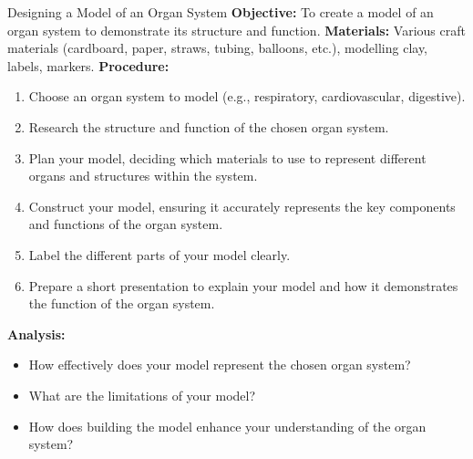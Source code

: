 \begin{investigation}{Designing a Model of an Organ System}
\textbf{Objective:} To create a model of an organ system to demonstrate its structure and function.
\textbf{Materials:}  Various craft materials (cardboard, paper, straws, tubing, balloons, etc.), modelling clay, labels, markers.
\textbf{Procedure:}
\begin{enumerate}
    \item Choose an organ system to model (e.g., respiratory, cardiovascular, digestive).
    \item Research the structure and function of the chosen organ system.
    \item Plan your model, deciding which materials to use to represent different organs and structures within the system.
    \item Construct your model, ensuring it accurately represents the key components and functions of the organ system.
    \item Label the different parts of your model clearly.
    \item Prepare a short presentation to explain your model and how it demonstrates the function of the organ system.
\end{enumerate}
\textbf{Analysis:}
\begin{itemize}
    \item How effectively does your model represent the chosen organ system?
    \item What are the limitations of your model?
    \item How does building the model enhance your understanding of the organ system?
\end{itemize}
\end{investigation}


